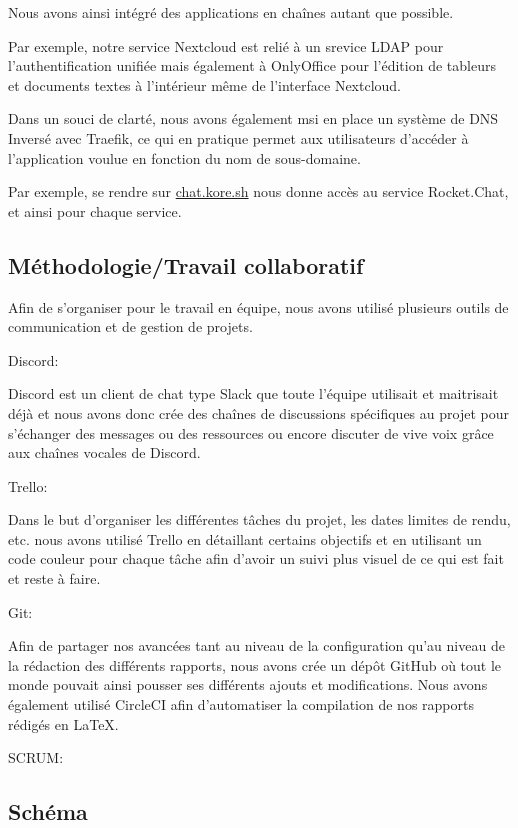 Nous avons ainsi intégré des applications en chaînes autant que possible.

Par exemple, notre service Nextcloud est relié à un srevice LDAP pour l'authentification unifiée mais également à OnlyOffice pour l'édition de tableurs et documents textes à l'intérieur même de l'interface Nextcloud.

Dans un souci de clarté, nous avons également msi en place un système de DNS Inversé avec Traefik, ce qui en pratique permet aux utilisateurs d'accéder à l'application voulue en fonction du nom de sous-domaine.

Par exemple, se rendre sur \href{http://chat.kore.sh}{chat.kore.sh} nous donne accès au service Rocket.Chat, et ainsi pour chaque service.

\subsection{Méthodologie/Travail collaboratif}

Afin de s'organiser pour le travail en équipe, nous avons utilisé plusieurs outils de communication et de gestion de projets.

Discord:

Discord est un client de chat type Slack que toute l'équipe utilisait et maitrisait déjà et nous avons donc crée des chaînes de discussions spécifiques au projet pour s'échanger des messages ou des ressources ou encore discuter de vive voix grâce aux chaînes vocales de Discord.

Trello:

Dans le but d'organiser les différentes tâches du projet, les dates limites de rendu, etc. nous avons utilisé Trello en détaillant certains objectifs et en utilisant un code couleur pour chaque tâche afin d'avoir un suivi plus visuel de ce qui est fait et reste à faire.

Git:

Afin de partager nos avancées tant au niveau de la configuration qu'au niveau de la rédaction des différents rapports, nous avons crée un dépôt GitHub où tout le monde pouvait ainsi pousser ses différents ajouts et  modifications. Nous avons également utilisé CircleCI afin d'automatiser la compilation de nos rapports rédigés en \LaTeX .

SCRUM:



\subsection{Schéma}

